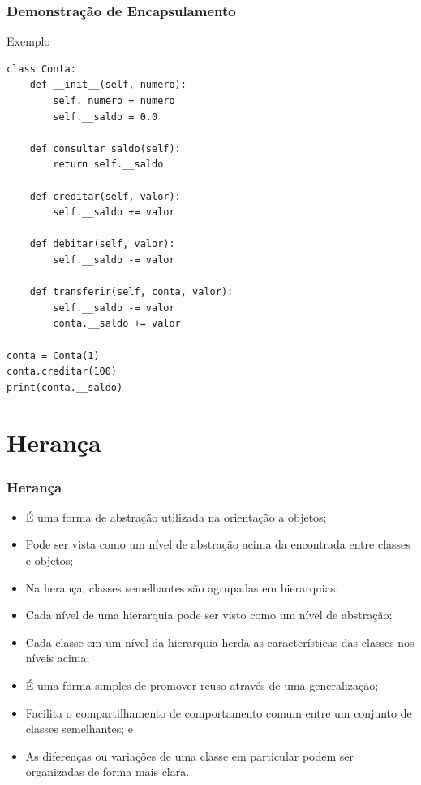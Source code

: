 \documentclass{beamer}
\begin{document}
\begin{frame}[fragile]
	\frametitle{Demonstração de Encapsulamento}
	
	\begin{exampleblock}{Exemplo}
		\begin{lstlisting}
class Conta:
    def __init__(self, numero):
        self._numero = numero
        self.__saldo = 0.0

    def consultar_saldo(self):
        return self.__saldo

    def creditar(self, valor):
        self.__saldo += valor

    def debitar(self, valor):
        self.__saldo -= valor

    def transferir(self, conta, valor):
        self.__saldo -= valor
        conta.__saldo += valor

conta = Conta(1)
conta.creditar(100)
print(conta.__saldo) 
        \end{lstlisting}
	\end{exampleblock}
\end{frame}

\section{Herança}

\begin{frame}
	\frametitle{Herança}
	
	\begin{itemize}
	  \item É uma forma de abstração utilizada na orientação a objetos;
	  \item Pode ser vista como um nível de abstração acima da encontrada entre
	  classes e objetos;
	  \item Na herança, classes semelhantes são agrupadas em hierarquias;
	  \item Cada nível de uma hierarquia pode ser visto como um nível de abstração;
	  \item Cada classe em um nível da hierarquia herda as características das
	  classes nos níveis acima;
	  \item É uma forma simples de promover reuso através de uma generalização;
	  \item Facilita o compartilhamento de comportamento comum entre um conjunto de
	  classes semelhantes; e
	  \item As diferenças ou variações de uma classe em particular podem ser
	  organizadas de forma mais clara.
	\end{itemize}
\end{frame}
\end{document}
